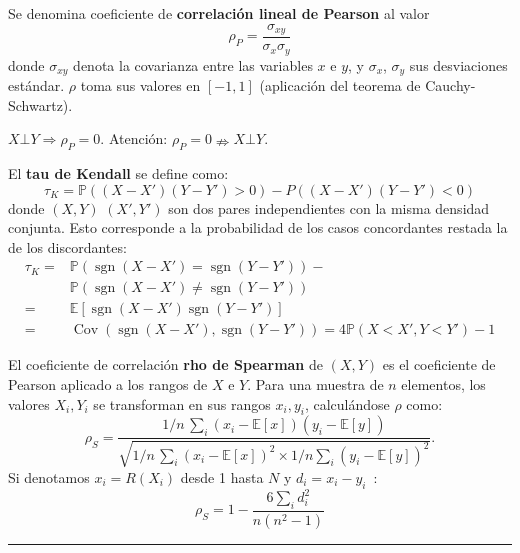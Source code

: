 \begin{f}
	
Se denomina coeficiente de \textbf{correlación lineal de Pearson} al valor
\[
\rho_P = \frac{\sigma_{xy}}{\sigma_x \sigma_y}
\]
donde \(\sigma_{xy}\) denota la covarianza entre las variables \(x\) e \(y\), y \(\sigma_x\), \(\sigma_y\) sus desviaciones estándar.
\(\rho\) toma sus valores en \([-1,1]\) (aplicación del teorema de Cauchy-Schwartz).

\(X\bot Y \Rightarrow \rho_P=0\). Atención: \(\rho_P=0 \nRightarrow X\bot Y \).  



El \textbf{tau de Kendall} se define como:
\[
\tau_K=\mathbb{P}((X-X')(Y-Y')>0)-P((X-X')(Y-Y')<0)
\]
donde \((X,Y)\)  \((X',Y')\)  son dos pares independientes con la misma densidad conjunta. Esto corresponde a  la probabilidad de los casos concordantes restada la de los discordantes:
\begin{align*}
\tau_K	=&\mathbb{P}\left(\operatorname{sgn}(X-X')=\operatorname{sgn}(Y-Y')\right)-\\
		&\mathbb{P}\left(\operatorname{sgn}(X-X')\neq \operatorname{sgn}(Y-Y')\right)\\
=&\mathbb{E}\left[ \operatorname{sgn}(X-X')\operatorname{sgn}(Y-Y')\right] \\
=&\operatorname{Cov}(\operatorname{sgn}(X-X'),\operatorname{sgn}(Y-Y'))=4\mathbb{P}(X<X',Y<Y')-1 
\end{align*}

El coeficiente de correlación \textbf{rho de Spearman} de \((X,Y)\) es el coeficiente de Pearson aplicado a los rangos de \(X\) e \(Y\). Para una muestra de \(n\) elementos, los valores \(X_i, Y_i\) se transforman en sus rangos \(x_i, y_i\), calculándose \(\rho\) como:
\[
\rho_S = \frac{1/n\,\sum_i(x_i-\mathbb{E}[x])(y_i-\mathbb{E}[y])}{\sqrt{1/n\,\sum_i (x_i-\mathbb{E}[x])^2 \times 1/n\sum_i(y_i-\mathbb{E}[y])^2}}.
\]
Si denotamos \(x_i = R(X_i)\) desde 1 hasta \(N\) y  \(d_i = x_i - y_i\)~:
\[    \rho_S = 1- {\frac {6 \sum_i d_i^2}{n(n^2 - 1)}}\]

\end{f}
\hrule

